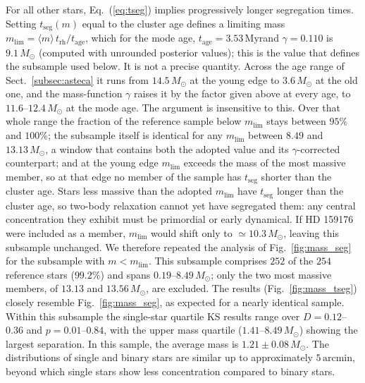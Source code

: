 \documentclass{aa}
\providecommand{\DIFaddtex}[1]{{\protect\color{red}\uwave{#1}}} %
\providecommand{\DIFaddbegin}{} %
\providecommand{\DIFaddend}{} %
\providecommand{\DIFadd}[1]{\texorpdfstring{\DIFaddtex{#1}}{#1}} %
\providecommand{\DIFaddincludegraphics}[2][]{{\color{blue}\fbox{\DIFOincludegraphics[#1]{#2}}}} %
\DeclareRobustCommand{\DIFaddbegin}{\DIFOaddbegin \let\includegraphics\DIFaddincludegraphics} %
\DeclareRobustCommand{\DIFaddend}{\DIFOaddend \let\includegraphics\DIFOincludegraphics} %
\begin{document}
For all other stars, Eq.~(\ref{eq:tseg}) implies progressively longer segregation times. Setting $t_{\mathrm{seg}}(m)$ equal to the cluster age defines a limiting mass\DIFaddbegin \DIFadd{, }\DIFaddend $m_{\mathrm{lim}} = \langle m \rangle\, t_{\mathrm{rh}}/t_{\mathrm{age}}$, which for the mode age, $t_{\mathrm{age}} = 3.53\,\mathrm{Myr}$\DIFaddbegin \DIFadd{, }\DIFaddend and $\gamma=0.110$ is $9.1\,M_\odot$ (computed with unrounded posterior values); this is the value that defines the subsample used below. It is not a precise quantity. Across the age range of Sect.~\ref{subsec:asteca} it runs from $14.5\,M_\odot$ at the young edge to $3.6\,M_\odot$ at the old one, and the mass-function $\gamma$ raises it by the factor given above at every age, to $11.6$--$12.4\,M_\odot$ at the mode age. The argument is insensitive to this. Over that whole range the fraction of the reference sample below $m_{\mathrm{lim}}$ stays between $95\%$ and $100\%$; the subsample itself is identical for any $m_{\mathrm{lim}}$ between $8.49$ and $13.13\,M_\odot$, a window that contains both the adopted value and its $\gamma$-corrected counterpart; and at the young edge $m_{\mathrm{lim}}$ exceeds the mass of the most massive member, so at that edge no member of the sample has $t_{\mathrm{seg}}$ shorter than the cluster age. Stars less massive than the adopted $m_{\mathrm{lim}}$ have $t_{\mathrm{seg}}$ longer than the cluster age, so two-body relaxation cannot yet have segregated them: any central concentration they exhibit must be primordial or early dynamical. If HD 159176 were included as a member, $m_{\mathrm{lim}}$ would shift only to $\simeq10.3\,M_\odot$, leaving this subsample unchanged. We therefore repeated the analysis of Fig.~\ref{fig:mass_seg} for the subsample with $m < m_{\mathrm{lim}}$. This subsample comprises $252$ of the $254$ reference stars ($99.2\%$) and spans $0.19$--$8.49\,M_\odot$; only the two most massive members, of $13.13$ and $13.56\,M_\odot$, are excluded. The results (Fig.~\ref{fig:mass_tseg}) closely resemble Fig.~\ref{fig:mass_seg}, as expected for a nearly identical sample. Within this subsample the single-star quartile KS results range over $D=0.12$--$0.36$ and $p=0.01$--$0.84$, with the upper mass quartile ($1.41$--$8.49\,M_\odot$) showing the largest separation. In this sample, the average mass is $1.21 \pm 0.08\,M_\odot$. The distributions of single and binary stars are similar up to approximately $5\,\mathrm{arcmin}$, beyond which single stars show less concentration compared to binary stars.
\end{document}
